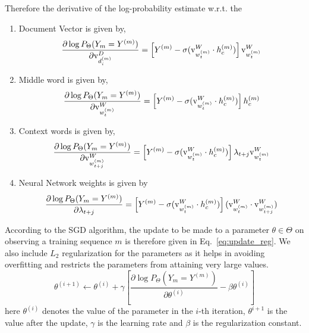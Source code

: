 Therefore the derivative of the log-probability estimate w.r.t. the 
\begin{enumerate}
\item
Document Vector is given by, 
\begin{equation}
\label{eq:grad_doc}
\frac{\partial \log P_{\Theta}(Y_{m}=Y^{(m)})} {\partial \mathrm{v}^{D}_{d^{(m)}_{i}}} = \left[ Y^{(m)} - \sigma(\mathrm{v}^{W}_{w^{(m)}_{t}} \cdot h^{(m)}_{c})\right] \mathrm{v}^{W}_{w^{(m)}_{t}}
\end{equation}
\item 
Middle word is given by,
\begin{equation}
\label{eq:grad_mword}
\frac{\partial \log P_{\Theta}(Y_{m}=Y^{(m)})} {\partial \mathrm{v}^{W}_{w^{(m)}_{t}}} = \left[ Y^{(m)} - \sigma(\mathrm{v}^{W}_{w^{(m)}_{t}} \cdot h^{(m)}_{c})\right] h^{(m)}_{c}
\end{equation}
\item 
Context words is given by,
\begin{equation}
\label{eq:grad_cword}
\frac{\partial \log P_{\Theta}(Y_{m}=Y^{(m)})} {\partial \mathrm{v}^{W}_{w^{(m)}_{t+j}}} = \left[ Y^{(m)} - \sigma(\mathrm{v}^{W}_{w^{(m)}_{t}} \cdot h^{(m)}_{c})\right] \lambda_{t+j} \mathrm{v}^{W}_{w^{(m)}_{t}}
\end{equation}
\item 
Neural Network weights is given by
\begin{equation}
\label{eq:grad_wgt}
\frac{\partial \log P_{\Theta}(Y_{m}=Y^{(m)})} {\partial \lambda_{t+j}} = \left[ Y^{(m)} - \sigma(\mathrm{v}^{W}_{w^{(m)}_{t}} \cdot h^{(m)}_{c})\right] (\mathrm{v}^{W}_{w^{(m)}_{t}} \cdot \mathrm{v}^{W}_{w^{(m)}_{t+j}})
\end{equation}
\end{enumerate}
According to the SGD algorithm, the update to be made to a parameter $\theta \in \Theta$ on observing a training sequence $m$ is therefore given in Eq.~\ref{eq:update_reg}. We also include $L_{2}$ regularization for the parameters as it helps in avoiding overfitting and restricts the  parameters from attaining very large values.
\begin{equation}
\label{eq:update_reg}
\theta^{(i+1)} \leftarrow \theta^{(i)} + \gamma \left[\frac{\partial \log P_{\Theta}(Y_{m} = Y^{(m)})}{\partial \theta^{(i)}} - \beta \theta^{(i)} \right]
\end{equation}
here $\theta^{(i)}$ denotes the value of the parameter in the $i$-th iteration, $\theta^{i+1}$ is the value after the update, $\gamma$ is the learning rate and $\beta$ is the regularization constant.
